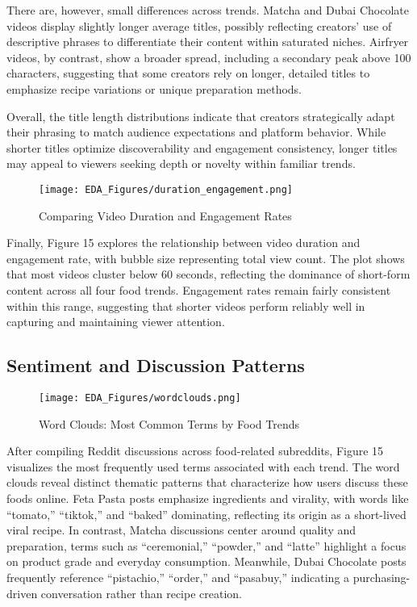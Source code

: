 \documentclass{article}
\begin{document}
There are, however, small differences across trends. Matcha and Dubai Chocolate videos display slightly longer average titles, possibly reflecting creators’ use of descriptive phrases to differentiate their content within saturated niches. Airfryer videos, by contrast, show a broader spread, including a secondary peak above 100 characters, suggesting that some creators rely on longer, detailed titles to emphasize recipe variations or unique preparation methods.

Overall, the title length distributions indicate that creators strategically adapt their phrasing to match audience expectations and platform behavior. While shorter titles optimize discoverability and engagement consistency, longer titles may appeal to viewers seeking depth or novelty within familiar trends.

\begin{figure}[H]
    \centering
    \texttt{[image: EDA\_Figures/duration\_engagement.png]}
    \caption{Comparing Video Duration and Engagement Rates}
    \label{fig:duration_engagement}
\end{figure}

Finally, Figure 15 explores the relationship between video duration and engagement rate, with bubble size representing total view count. The plot shows that most videos cluster below 60 seconds, reflecting the dominance of short-form content across all four food trends. Engagement rates remain fairly consistent within this range, suggesting that shorter videos perform reliably well in capturing and maintaining viewer attention.

\subsection{Sentiment and Discussion Patterns}

\begin{figure}[H]
    \centering
    \texttt{[image: EDA\_Figures/wordclouds.png]}
    \caption{Word Clouds: Most Common Terms by Food Trends}
    \label{fig:wordclouds}
\end{figure}

After compiling Reddit discussions across food-related subreddits, Figure 15 visualizes the most frequently used terms associated with each trend. The word clouds reveal distinct thematic patterns that characterize how users discuss these foods online. Feta Pasta posts emphasize ingredients and virality, with words like “tomato,” “tiktok,” and “baked” dominating, reflecting its origin as a short-lived viral recipe. In contrast, Matcha discussions center around quality and preparation, terms such as “ceremonial,” “powder,” and “latte” highlight a focus on product grade and everyday consumption. Meanwhile, Dubai Chocolate posts frequently reference “pistachio,” “order,” and “pasabuy,” indicating a purchasing-driven conversation rather than recipe creation.
\end{document}
